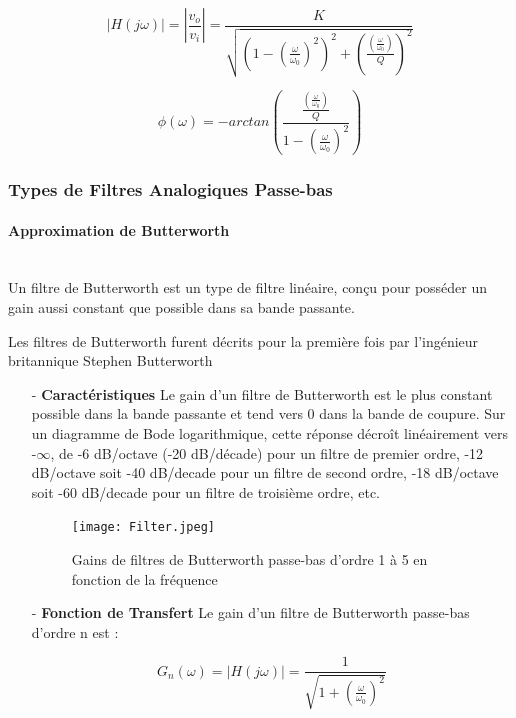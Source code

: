 \documentclass[conference,onecolumn]{IEEEtran}
\begin{document}
\begin{equation}
    |H(j\omega)| = |\frac{v_o}{v_i}| = \frac{K}{\sqrt{(1 - (\frac{\omega}{\omega_0})^2)^2 + (\frac{(\frac{\omega}{\omega_0})}{Q})^2}}
\end{equation}

\begin{equation}
    \phi(\omega) = -arctan(\frac{\frac{(\frac{\omega}{\omega_0})}{Q}}{1 - (\frac{\omega}{\omega_0})^2})
\end{equation}

\subsubsection{Types de Filtres Analogiques Passe-bas}
\paragraph{Approximation de Butterworth}
\hfill \\
Un filtre de Butterworth est un type de filtre linéaire, conçu pour posséder un gain aussi constant que possible dans sa bande passante.

Les filtres de Butterworth furent décrits pour la première fois par l'ingénieur britannique Stephen Butterworth

\begin{itemize}
  \item[-] \textbf{Caractéristiques}
  Le gain d'un filtre de Butterworth est le plus constant possible dans la bande passante et tend vers 0 dans la bande de coupure. Sur un diagramme de Bode logarithmique, cette réponse décroît linéairement vers -$\infty$, de -6 dB/octave (-20 dB/décade) pour un filtre de premier ordre, -12 dB/octave soit -40 dB/decade pour un filtre de second ordre, -18 dB/octave soit -60 dB/decade pour un filtre de troisième ordre, etc.
  
  \begin{figure}[H]
 \centering
    \texttt{[image: Filter.jpeg]}
    \caption{Gains de filtres de Butterworth passe-bas d'ordre 1 à 5 en fonction de la fréquence}
\end{figure}
  
  \item[-] \textbf{Fonction de Transfert}
  Le gain d'un filtre de Butterworth passe-bas d'ordre n est :
  
  \begin{equation}
      G_n(\omega) = |H(j\omega)| = \frac{1}{\sqrt{1 + (\frac{\omega}{\omega_0})^2}}
  \end{equation}

\end{itemize}
\end{document}

